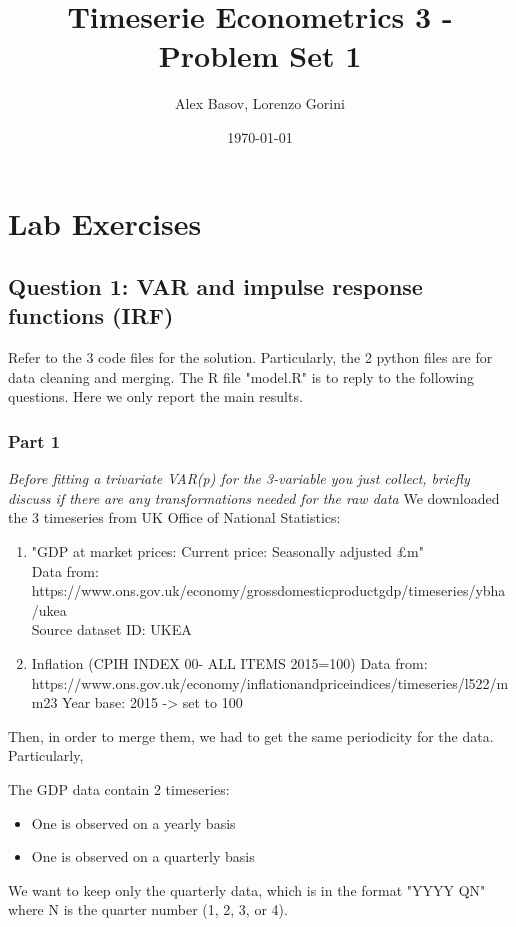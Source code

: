 \documentclass[10pt]{article}
\title{Timeserie Econometrics 3 - Problem Set 1}
\author{Alex Basov, Lorenzo Gorini}
\date{\today}
\begin{document}
	
	\maketitle
	\vspace{1cm}
	
	\section*{Lab Exercises}
	\subsection*{Question 1: VAR and impulse response functions (IRF)}
		Refer to the 3 code files for the solution. Particularly, the 2 python files are for data cleaning and merging. The R file "model.R" is to reply to the following questions.
		Here we only report the main results.
		
		\subsubsection*{Part 1}
		\textit{Before fitting a trivariate VAR(p) for the 3-variable you just collect, briefly discuss if there are any transformations needed for the raw data}
		We downloaded the 3 timeseries from UK Office of National Statistics:
		\begin{enumerate}
			\item "GDP at market prices: Current price: Seasonally adjusted £m" \\
			Data from: https://www.ons.gov.uk/economy/grossdomesticproductgdp/timeseries/ybha/ukea \\
			Source dataset ID: UKEA
			\item Inflation (CPIH INDEX 00- ALL ITEMS 2015=100)
			Data from:
			https://www.ons.gov.uk/economy/inflationandpriceindices/timeseries/l522/mm23
			Year base: 2015 -> set to 100
		\end{enumerate}
		Then, in order to merge them, we had to get the same periodicity for the data.
		Particularly,  
		
		The GDP data contain 2 timeseries:
		\begin{itemize}
			\item One is observed on a yearly basis
			\item One is observed on a quarterly basis
		\end{itemize}
		We want to keep only the quarterly data, which is in the format "YYYY QN" where N is
		the quarter number (1, 2, 3, or 4).
		
\end{document}
